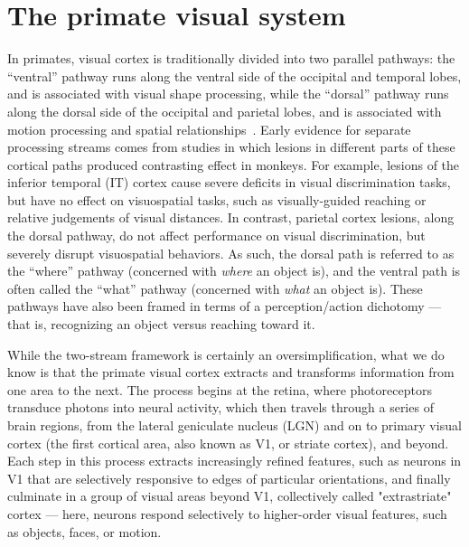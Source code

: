 \section{The primate visual system}
In primates, visual cortex is traditionally divided into two parallel pathways: the ``ventral'' pathway runs along the ventral side of the occipital and temporal lobes, and is associated with visual shape processing, while the  ``dorsal'' pathway runs along the dorsal side of the occipital and parietal lobes, and is associated with motion processing and spatial relationships~\cite{Mishkin1982CONTRIBUTIONMONKEYS, Ungerleider1994WhatBrain, Felleman1991}. Early evidence for separate processing streams comes from studies in which lesions in different parts of these cortical paths produced contrasting effect in monkeys. For example, lesions of the inferior temporal (IT) cortex cause severe deficits in visual discrimination tasks, but have no effect on visuospatial tasks, such as visually-guided reaching or relative judgements of visual distances. In contrast, parietal cortex lesions, along the dorsal pathway, do not affect performance on visual discrimination, but severely disrupt visuospatial behaviors. As such, the dorsal path is referred to as the ``where'' pathway (concerned with \textit{where} an object is), and the ventral path is often called the ``what'' pathway (concerned with \textit{what} an object is)\cite{Ungerleider1994WhatBrain}. These pathways have also been framed in terms of a perception/action dichotomy --- that is, recognizing an object versus reaching toward it\cite{Goodale1992}.

While the two-stream framework is certainly an oversimplification, what we do know is that the primate visual cortex extracts and transforms information from one area to the next. The process begins at the retina, where photoreceptors transduce photons into neural activity, which then travels through a series of brain regions, from the lateral geniculate nucleus (LGN) and on to primary visual cortex (the first cortical area, also known as V1, or striate cortex), and beyond. Each step in this process extracts increasingly refined features, such as neurons in V1 that are selectively responsive to edges of particular orientations, and finally culminate in a group of visual areas beyond V1, collectively called "extrastriate" cortex --- here, neurons respond selectively to higher-order visual features, such as objects, faces, or motion\cite{Orban2008, Dicarlo2012}. 

